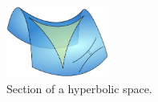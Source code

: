 \begin{figure}
        
            
            

                
            

    \centering
    \includegraphics[width=0.3\textwidth]{figs/Hyperbolic_triangle.png}    
    \caption{Section of a hyperbolic space.}
    \label{fig:hyperbolicSpace}
\end{figure}



